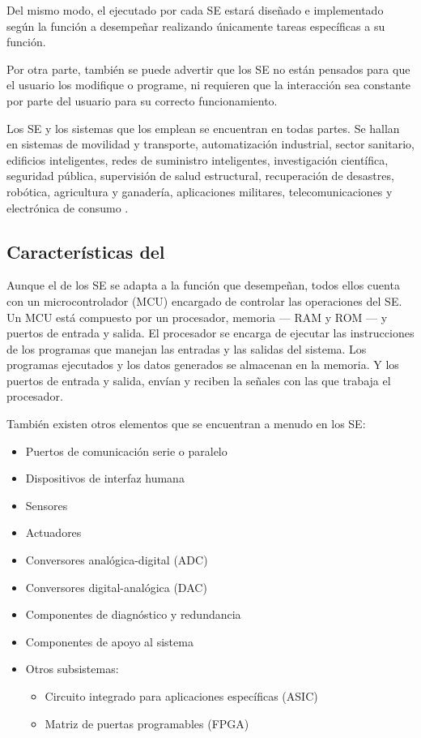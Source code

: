Del mismo modo, el  ejecutado por cada SE estará
diseñado e implementado según la función a desempeñar realizando únicamente
tareas específicas a su función.

Por otra parte, también se puede advertir que los SE no están pensados para que
el usuario los modifique o programe, ni requieren que la interacción sea
constante por parte del usuario para su correcto funcionamiento.

Los SE y los sistemas que los emplean se encuentran en todas partes. Se hallan
en sistemas de movilidad y transporte, automatización industrial, sector
sanitario, edificios inteligentes, redes de suministro inteligentes,
investigación científica, seguridad pública, supervisión de salud estructural,
recuperación de desastres, robótica, agricultura y ganadería, aplicaciones
militares, telecomunicaciones y electrónica de consumo \cite{marwedel2018}.

\subsection{Características del }{\label{sec:se-hw}}
Aunque el  de los SE se adapta a la función que
desempeñan, todos ellos cuenta con un microcontrolador (MCU) encargado de
controlar las operaciones del SE. Un MCU está compuesto por un procesador,
memoria --- RAM y ROM --- y puertos de entrada y salida. El procesador se
encarga de ejecutar las instrucciones de los programas que manejan las entradas
y las salidas del sistema. Los programas ejecutados y los datos generados se
almacenan en la memoria. Y los puertos de entrada y salida, envían y reciben la
señales con las que trabaja el procesador\cite{jimenez2014}.

También existen otros elementos que se encuentran a menudo en los SE:
\begin{itemize}
    \item Puertos de comunicación serie o paralelo
    \item Dispositivos de interfaz humana
    \item Sensores
    \item Actuadores
    \item Conversores analógica-digital (ADC)
    \item Conversores digital-analógica (DAC)
    \item Componentes de diagnóstico y redundancia
    \item Componentes de apoyo al sistema
    \item Otros subsistemas:
    \begin{itemize}
        \item Circuito integrado para aplicaciones específicas (ASIC)
        \item Matriz de puertas programables (FPGA)
    \end{itemize}
\end{itemize}

